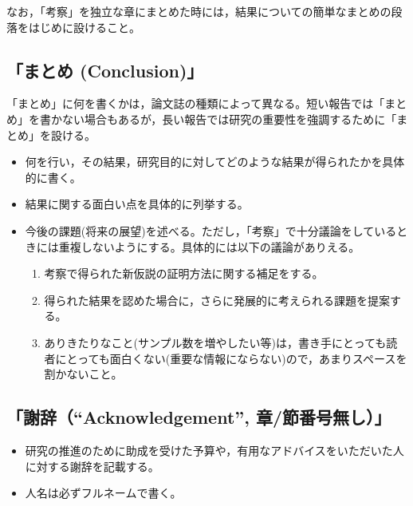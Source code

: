 \documentclass[12pt, ]{jsarticle}
\providecommand{\tightlist}{%
   \setlength{\itemsep}{0pt}\setlength{\parskip}{0pt}}
\begin{document}
なお，「考察」を独立な章にまとめた時には，結果についての簡単なまとめの段落をはじめに設けること。

\hypertarget{ux307eux3068ux3081-conclusion}{%
\subsection{「まとめ
(Conclusion)」}\label{ux307eux3068ux3081-conclusion}}

「まとめ」に何を書くかは，論文誌の種類によって異なる。短い報告では「まとめ」を書かない場合もあるが，長い報告では研究の重要性を強調するために「まとめ」を設ける。

\begin{itemize}
\tightlist
\item
  何を行い，その結果，研究目的に対してどのような結果が得られたかを具体的に書く。
\item
  結果に関する面白い点を具体的に列挙する。
\item
  今後の課題(将来の展望)を述べる。ただし，「考察」で十分議論をしているときには重複しないようにする。具体的には以下の議論がありえる。

  \begin{enumerate}
  \tightlist
  \item
    考察で得られた新仮説の証明方法に関する補足をする。
  \item
    得られた結果を認めた場合に，さらに発展的に考えられる課題を提案する。
  \item
    ありきたりなこと(サンプル数を増やしたい等)は，書き手にとっても読者にとっても面白くない(重要な情報にならない)ので，あまりスペースを割かないこと。
  \end{enumerate}
\end{itemize}

\hypertarget{ux8b1dux8f9eacknowledgement-ux7ae0ux7bc0ux756aux53f7ux7121ux3057}{%
\subsection{「謝辞（``Acknowledgement'',
章/節番号無し）」}\label{ux8b1dux8f9eacknowledgement-ux7ae0ux7bc0ux756aux53f7ux7121ux3057}}

\begin{itemize}
\tightlist
\item
  研究の推進のために助成を受けた予算や，有用なアドバイスをいただいた人に対する謝辞を記載する。
\item
  人名は必ずフルネームで書く。
\end{itemize}
\end{document}
